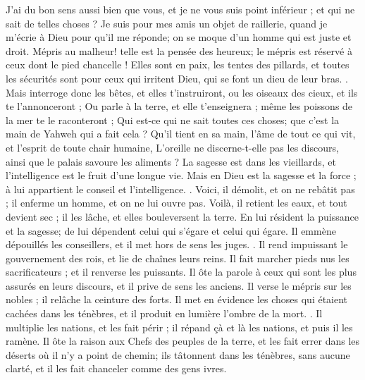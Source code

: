\begin{multicols}{2}
J'ai du bon sens aussi bien que vous, et je ne vous suis point inférieur ; et qui ne sait de telles choses ?
Je suis pour mes amis un objet de raillerie, quand je m'écrie à Dieu pour qu'il me réponde; on se moque d'un homme qui est juste et droit.
 Mépris au malheur! telle est la pensée des heureux; le mépris est réservé à ceux dont le pied chancelle !
Elles sont en paix, les tentes des pillards, et toutes les sécurités sont pour ceux qui irritent Dieu, qui se font un dieu de leur bras. .
Mais interroge donc les bêtes, et elles t'instruiront, ou les oiseaux des cieux, et ils te l'annonceront ;
Ou parle à la terre, et elle t'enseignera ; même les poissons de la mer te le raconteront ; 
Qui est-ce qui ne sait toutes ces choses; que c'est la main de Yahweh qui a fait cela ?
 Qu'il tient en sa main, l'âme de tout ce qui vit, et l'esprit de toute chair humaine,
L'oreille ne discerne-t-elle pas les discours, ainsi que le palais savoure les aliments ?
La sagesse est dans les vieillards, et l'intelligence est le fruit d'une longue vie.
Mais en Dieu est la sagesse et la force ; à lui appartient le conseil et l'intelligence. .
Voici, il démolit, et on ne rebâtit pas ; il enferme un homme, et on ne lui ouvre pas.
Voilà, il retient les eaux, et tout devient sec ; il les lâche, et elles bouleversent la terre.
 En lui résident la puissance et la sagesse; de lui dépendent celui qui s'égare et celui qui égare.
 Il emmène dépouillés les conseillers, et il met hors de sens les juges. .
Il rend impuissant le gouvernement des rois, et lie de chaînes leurs reins. 
Il fait marcher pieds nus les sacrificateurs ; et il renverse les puissants.
Il ôte la parole à ceux qui sont les plus assurés en leurs discours, et il prive de sens les anciens.
Il verse le mépris sur les nobles ; il relâche la ceinture des forts.
Il met en évidence les choses qui étaient cachées dans les ténèbres, et il produit en lumière l'ombre de la mort. .
 Il multiplie les nations, et les fait périr ; il répand çà et là les nations, et puis il les ramène. 
Il ôte la raison aux Chefs des peuples de la terre, et les fait errer dans les déserts où il n'y a point de chemin;
ils tâtonnent dans les ténèbres, sans aucune clarté, et il les fait chanceler comme des gens ivres. 

\end{multicols}
